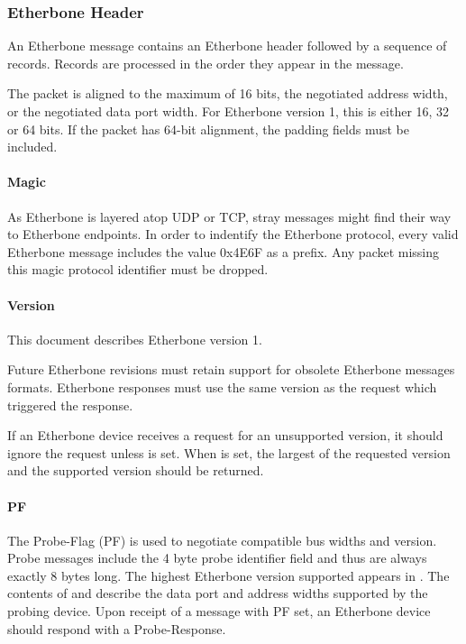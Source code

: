 \documentclass{article}
\begin{document}
\subsubsection{Etherbone Header}

An Etherbone message contains an Etherbone header followed by a sequence of records.
Records are processed in the order they appear in the message.


The packet is aligned to the maximum of 16 bits, 
the negotiated address width, or 
the negotiated data port width.
For Etherbone version 1, this is either 16, 32 or 64 bits.
If the packet has 64-bit alignment, the padding fields must be included.

\paragraph{Magic} \label{field:Magic}

As Etherbone is layered atop UDP or TCP, 
stray messages might find their way to Etherbone endpoints.
In order to indentify the Etherbone protocol,
every valid Etherbone message includes the value 0x4E6F as a prefix.
Any packet missing this magic protocol identifier must be dropped.

\paragraph{Version} \label{field:Version}

This document describes Etherbone version 1.

Future Etherbone revisions must retain support for obsolete
Etherbone messages formats.
Etherbone responses must use the same version as the request
which triggered the response.

If an Etherbone device receives a request for an unsupported version,
it should ignore the request unless  is set.
When  is set, the largest of the requested version
and the supported version should be returned.

\paragraph{PF} \label{field:PF}

The Probe-Flag (PF) is used to negotiate compatible bus widths and version.
Probe messages include the 4 byte probe identifier field
and thus are always exactly 8 bytes long.
The highest Etherbone version supported appears in .
The contents of  and  
describe the data port and address widths supported by the probing device.
Upon receipt of a message with PF set, 
an Etherbone device should respond with a Probe-Response.
\end{document}
